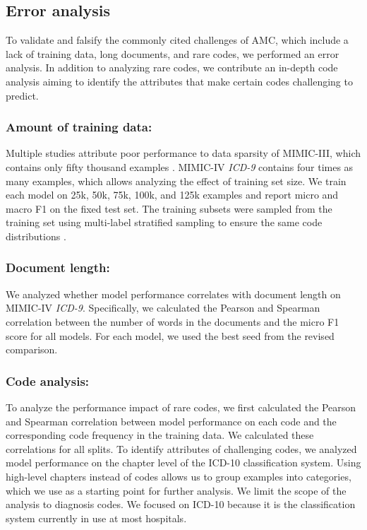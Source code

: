 {\subsection{Error analysis}
To validate and falsify the commonly cited challenges of AMC, which include a lack of training data, long documents, and rare codes, we performed an error analysis. In addition to analyzing rare codes, we contribute an in-depth code analysis aiming to identify the attributes that make certain codes challenging to predict.


\subsubsection{Amount of training data:}
Multiple studies attribute poor performance to data sparsity of MIMIC-III, which contains only fifty thousand examples \cite{kavuluruEmpiricalEvaluationSupervised2015,tengExplainablePredictionMedical2020,yanMedicalCodingClassification2010,yangKnowledgeInjectedPrompt2022}. MIMIC-IV \textit{ICD-9} contains four times as many examples, which allows analyzing the effect of training set size. We train each model on 25k, 50k, 75k, 100k, and 125k examples and report micro and macro F1 on the fixed test set. The training subsets were sampled from the training set using multi-label stratified sampling to ensure the same code distributions \cite{sechidisStratificationMultilabelData2011}.

\subsubsection{Document length:}
We analyzed whether model performance correlates with document length on MIMIC-IV \textit{ICD-9}. Specifically, we calculated the Pearson and Spearman correlation between the number of words in the documents and the micro F1 score for all models. For each model, we used the best seed from the revised comparison.

\subsubsection{Code analysis:}
To analyze the performance impact of rare codes, we first calculated the Pearson and Spearman correlation between model performance on each code and the corresponding code frequency in the training data. We calculated these correlations for all splits. To identify attributes of challenging codes, we analyzed model performance on the chapter level of the ICD-10 classification system. Using high-level chapters instead of codes allows us to group examples into categories, which we use as a starting point for further analysis. We limit the scope of the analysis to diagnosis codes. We focused on ICD-10 because it is the classification system currently in use at most hospitals. 


}
